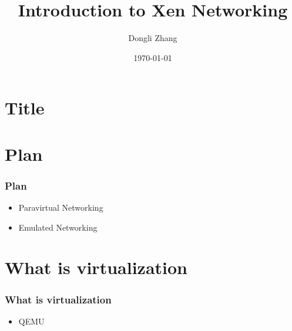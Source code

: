 \documentclass[aspectratio=169]{beamer}
\title[Introduction to Xen Networking]{Introduction to Xen Networking} %
\author{Dongli Zhang} %
\institute[Oracle] %
{
Oracle Asia Research and Development Centers (Beijing) \\ %
\medskip
\textit{dongli.zhang@oracle.com} %
}
\date{\today} %
\begin{document}

\section{Title}
\begin{frame}
\titlepage %
\end{frame}


\section{Plan}
\begin{frame}
\frametitle{Plan}
\begin{itemize}
\setlength\itemsep{1em}
\item {\large Paravirtual Networking}
\item {\large Emulated Networking}
\end{itemize}
\end{frame}


\section{What is virtualization}
\begin{frame}
\frametitle{What is virtualization}
\begin{itemize}
\item QEMU
\end{itemize}
\end{frame}

\end{document}
